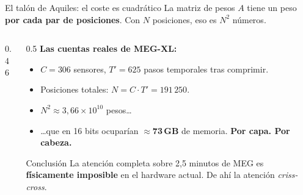 \documentclass[aspectratio=169,10pt]{beamer}
\newcommand{\term}[1]{\textbf{\color{deepgreen}#1}}
\begin{document}
\begin{frame}[c]{El talón de Aquiles: el coste es cuadrático}
  \footnotesize
  La matriz de pesos $A$ tiene un peso \term{por cada par de posiciones}. Con $N$ posiciones, eso es $N^2$ números.
  \vspace{2mm}
  \begin{columns}[c,totalwidth=\linewidth]
    \begin{column}{0.46\linewidth}
      \centering
    \end{column}
    \begin{column}{0.5\linewidth}
      \textbf{Las cuentas reales de MEG-XL:}
      \begin{itemize}
        \item $C = 306$ sensores, $T' = 625$ pasos temporales tras comprimir.
        \item Posiciones totales: $N = C\cdot T' = 191\,250$.
        \item $N^2 \approx 3{,}66\times10^{10}$ pesos\ldots
        \item \ldots que en 16 bits ocuparían \term{$\approx$73\,GB} de memoria. \term{Por capa. Por cabeza.}
      \end{itemize}
      \vspace{2mm}
      \begin{alertblock}{Conclusión}
        La atención completa sobre 2,5 minutos de MEG es \term{físicamente imposible} en el hardware actual. De ahí la atención \emph{criss-cross}.
      \end{alertblock}
    \end{column}
  \end{columns}
\end{frame}
\end{document}
